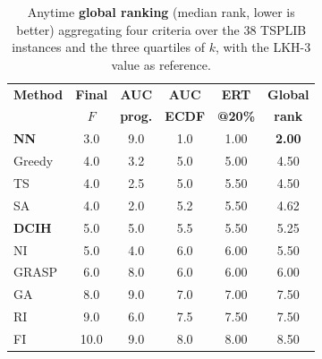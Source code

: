 \begin{table}[htbp]
\centering
\caption{Anytime \textbf{global ranking} (median rank, lower is better) aggregating four criteria over the 38 TSPLIB instances and the three quartiles of $k$, with the LKH-3 value as reference.}
\label{tab:anytime_ranking}
\begin{tabular}{|l|c|c|c|c|c|}
\hline
\textbf{Method} & \textbf{Final} & \textbf{AUC} & \textbf{AUC} & \textbf{ERT} & \textbf{Global} \\
                & \textbf{$F$}   & \textbf{prog.}& \textbf{ECDF}& \textbf{@20\%}& \textbf{rank} \\
\hline
\textbf{NN} & 3.0 & 9.0 & 1.0 & 1.00 & \textbf{2.00} \\
Greedy & 4.0 & 3.2 & 5.0 & 5.00 & 4.50 \\
TS & 4.0 & 2.5 & 5.0 & 5.50 & 4.50 \\
SA & 4.0 & 2.0 & 5.2 & 5.50 & 4.62 \\
\textbf{DCIH} & 5.0 & 5.0 & 5.5 & 5.50 & 5.25 \\
NI & 5.0 & 4.0 & 6.0 & 6.00 & 5.50 \\
GRASP & 6.0 & 8.0 & 6.0 & 6.00 & 6.00 \\
GA & 8.0 & 9.0 & 7.0 & 7.00 & 7.50 \\
RI & 9.0 & 6.0 & 7.5 & 7.50 & 7.50 \\
FI & 10.0 & 9.0 & 8.0 & 8.00 & 8.50 \\
\hline
\end{tabular}
\end{table}
